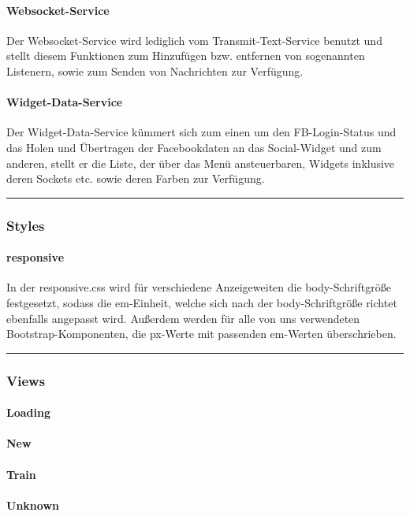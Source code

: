 \documentclass[10pt,a4paper]{report}
\newcommand{\code}[1]{{\fontfamily{cmvtt}\selectfont #1}}
\newcommand{\HRule}{\rule{\linewidth}{0.1pt}} %
\begin{document}
				\paragraph{Websocket-Service}
					Der Websocket-Service wird lediglich vom Transmit-Text-Service benutzt und stellt diesem Funktionen zum Hinzufügen bzw. entfernen von sogenannten Listenern, sowie zum Senden von Nachrichten zur Verfügung.
				\paragraph{Widget-Data-Service}
					Der Widget-Data-Service kümmert sich zum einen um den FB-Login-Status und das Holen und Übertragen der Facebookdaten an das Social-Widget und zum anderen, stellt er die Liste, der über das Menü ansteuerbaren, Widgets inklusive deren Sockets etc. sowie deren Farben zur Verfügung.\\
					\HRule
			\subsubsection{Styles}
				\paragraph{responsive}
					In der responsive.css wird für verschiedene Anzeigeweiten die body-Schriftgröße festgesetzt, sodass die \code{em}-Einheit, welche sich nach der body-Schriftgröße richtet ebenfalls angepasst wird. Außerdem werden für alle von uns verwendeten Bootstrap-Komponenten, die \code{px}-Werte mit passenden \code{em}-Werten überschrieben.\\
					\HRule
			\subsubsection{Views}
				\paragraph{Loading}
				\paragraph{New}
				\paragraph{Train}
				\paragraph{Unknown}
\end{document}
